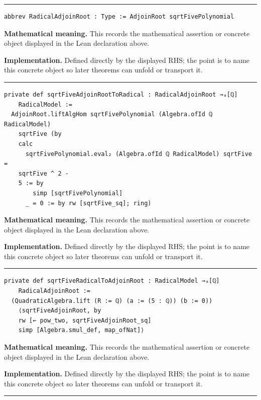 \documentclass[UTF8,a4paper,11pt,fontset=fandol]{ctexart}
\theoremstyle{definition}
\newcommand{\statementsep}{\par\medskip\hrule\medskip}
\begin{document}
\statementsep
\begin{verbatim}
abbrev RadicalAdjoinRoot : Type := AdjoinRoot sqrtFivePolynomial
\end{verbatim}
\noindent\textbf{Mathematical meaning.} This records the mathematical assertion or concrete object displayed in the Lean declaration above.\par
\noindent\textbf{Implementation.} Defined directly by the displayed RHS; the point is to name this concrete object so later theorems can unfold or transport it.\par
\statementsep
\begin{verbatim}
private def sqrtFiveAdjoinRootToRadical : RadicalAdjoinRoot →ₐ[ℚ]
    RadicalModel :=
  AdjoinRoot.liftAlgHom sqrtFivePolynomial (Algebra.ofId ℚ RadicalModel)
    sqrtFive (by
    calc
      sqrtFivePolynomial.eval₂ (Algebra.ofId ℚ RadicalModel) sqrtFive =
    sqrtFive ^ 2 -
    5 := by
        simp [sqrtFivePolynomial]
      _ = 0 := by rw [sqrtFive_sq]; ring)
\end{verbatim}
\noindent\textbf{Mathematical meaning.} This records the mathematical assertion or concrete object displayed in the Lean declaration above.\par
\noindent\textbf{Implementation.} Defined directly by the displayed RHS; the point is to name this concrete object so later theorems can unfold or transport it.\par
\statementsep
\begin{verbatim}
private def sqrtFiveRadicalToAdjoinRoot : RadicalModel →ₐ[ℚ]
    RadicalAdjoinRoot :=
  (QuadraticAlgebra.lift (R := ℚ) (a := (5 : ℚ)) (b := 0))
    ⟨sqrtFiveAdjoinRoot, by
    rw [← pow_two, sqrtFiveAdjoinRoot_sq]
    simp [Algebra.smul_def, map_ofNat]⟩
\end{verbatim}
\noindent\textbf{Mathematical meaning.} This records the mathematical assertion or concrete object displayed in the Lean declaration above.\par
\noindent\textbf{Implementation.} Defined directly by the displayed RHS; the point is to name this concrete object so later theorems can unfold or transport it.\par
\statementsep
\end{document}
